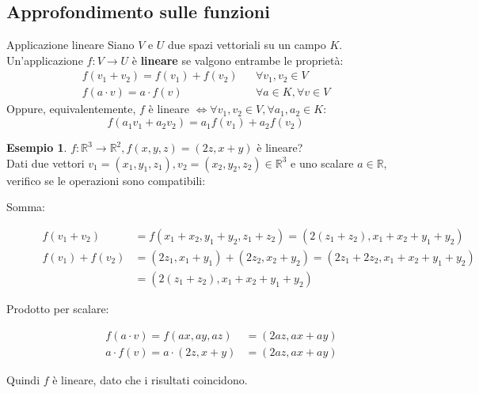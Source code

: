 \documentclass[a4paper]{article}
\theoremstyle{definition}
\newtheorem*{es}{Esempio}
\begin{document}
\subsection{Approfondimento sulle funzioni}
\begin{deff}{Applicazione lineare}{}
	Siano $V$ e $U$ due spazi vettoriali su un campo $K$.
	Un'applicazione $f: V \rightarrow U$ è \textbf{lineare} se valgono entrambe le proprietà:
	\begin{align*}
		f(v_1 + v_2) = f(v_1) + f(v_2) &  & \forall v_1, v_2 \in V           \\
		f(a \cdot v) = a \cdot f(v)    &  & \forall a \in K, \forall v \in V
	\end{align*}
	Oppure, equivalentemente, $f$ è lineare $\Leftrightarrow \forall v_1, v_2 \in V, \forall a_1, a_2 \in K$:
	\begin{equation*}
		f(a_1v_1 + a_2v_2) = a_1f(v_1) + a_2f(v_2)
	\end{equation*}
\end{deff}
\begin{es}
	$f: \mathbb{R}^3 \rightarrow \mathbb{R}^2, f(x, y, z) = (2z, x + y)$ è lineare? \\
	Dati due vettori $v_1 = (x_1, y_1, z_1), v_2 = (x_2, y_2, z_2) \in \mathbb{R}^3$ e uno scalare $a \in \mathbb{R}$,
	verifico se le operazioni sono compatibili:
	\begin{description}
		\item[Somma:] 
		\begin{align*}
			f(v_1 + v_2)    & = f(x_1 + x_2, y_1 + y_2, z_1 + z_2) = (2(z_1 + z_2), x_1 + x_2 + y_1 + y_2)   \\
			f(v_1) + f(v_2) & = (2z_1, x_1 + y_1) + (2z_2, x_2 + y_2) = (2z_1 + 2z_2, x_1 + x_2 + y_1 + y_2) \\
							& = (2(z_1 + z_2), x_1 + x_2 + y_1 + y_2)
		\end{align*}
		\item[Prodotto per scalare:]
		\begin{align*}
			f(a \cdot v) = f(ax, ay, az)       & = (2az, ax + ay) \\
			a \cdot f(v) = a \cdot (2z, x + y) & = (2az, ax + ay)
		\end{align*}
	\end{description}
	Quindi $f$ è lineare, dato che i risultati coincidono.
\end{es}
\end{document}
